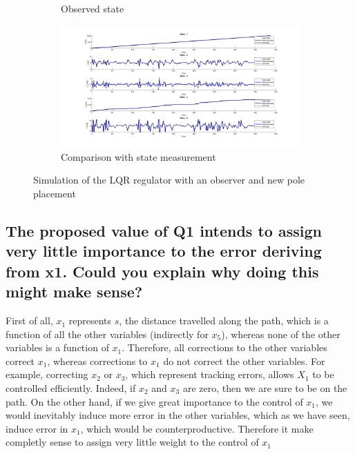 \begin{figure}[H]
\begin{subfigure}[b]{0.8\textwidth}
         \caption{Observed state}
         \label{fig:State}
     \end{subfigure}
     \begin{subfigure}[b]{0.8\textwidth}
         \centering
         \includegraphics[width=\textwidth]{Latex report/image/ex2/obs.png}
         \caption{Comparison with state measurement}
         \label{fig:Obs}
     \end{subfigure}
    \caption{Simulation of the LQR regulator with an observer and new pole placement}
    \label{fig:sim}
\end{figure}

\subsection{The proposed value of Q1 intends to assign very little importance to the error deriving from x1. Could you explain why doing this might make sense?}
First of all, $x_1$ represents $s$, the distance travelled along the path, which is a function of all the other variables (indirectly for $x_5$), whereas none of the other variables is a function of $x_1$. Therefore, all corrections to the other variables correct $x_1$, whereas corrections to $x_1$ do not correct the other variables. For example, correcting $x_2$ or $x_3$, which represent tracking errors, allows $X_1$ to be controlled efficiently. Indeed, if $x_2$ and $x_3$ are zero, then we are sure to be on the path.
On the other hand, if we give great importance to the control of $x_1$, we would inevitably induce more error in the other variables, which as we have seen, induce error in $x_1$, which would be counterproductive. Therefore it make completly sense to assign very little weight to the control of $x_1$



